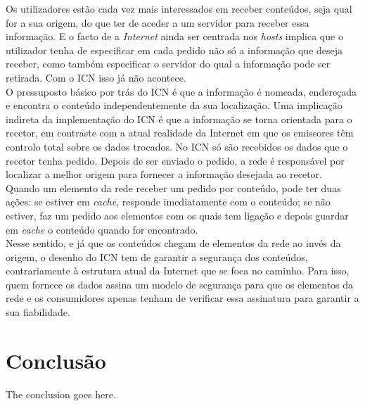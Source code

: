 \documentclass[conference]{IEEEtran}
\begin{document}
Os utilizadores est\~{a}o cada vez mais interessados em receber conte\'{u}dos, seja qual for a sua origem, do que ter de aceder a um servidor para receber essa informa\c{c}\~{a}o. E o facto de a \textit{Internet} ainda ser centrada nos \textit{hosts} implica que o utilizador tenha de especificar em cada pedido n\~{a}o s\'{o} a informa\c{c}\~{a}o que deseja receber, como tamb\'{e}m especificar o servidor do qual a informa\c{c}\~{a}o pode ser retirada. Com o ICN isso j\'{a} n\~{a}o acontece\cite{surveyICN}.\\

O pressuposto b\'{a}sico por tr\'{a}s do ICN \'{e} que a informa\c{c}\~{a}o \'{e} nomeada, endere\c{c}ada e encontra o conte\'{u}do independentemente da sua localiza\c{c}\~{a}o. Uma implica\c{c}\~{a}o indireta da implementa\c{c}\~{a}o do ICN \'{e} que a informa\c{c}\~{a}o se torna orientada para o recetor, em contraste com a atual realidade da Internet em que os emissores t\^{e}m controlo total sobre os dados trocados\cite{publishSubscribe}. No ICN s\'{o} s\~{a}o recebidos os dados que o recetor tenha pedido. Depois de ser enviado o pedido, a rede \'{e} respons\'{a}vel por localizar a melhor origem para fornecer a informa\c{c}\~{a}o desejada ao recetor.\\

Quando um elemento da rede receber um pedido por conte\'{u}do, pode ter duas a\c{c}\~{o}es: se estiver em \textit{cache}, responde imediatamente com o conte\'{u}do; se n\~{a}o estiver, faz um pedido aos elementos com os quais tem liga\c{c}\~{a}o e depois guardar em \textit{cache} o conte\'{u}do quando for encontrado\cite{surveyICN}.\\

Nesse sentido, e j\'{a} que os conte\'{u}dos chegam de elementos da rede ao inv\'{e}s da origem, o desenho do ICN tem de garantir a seguran\c{c}a dos conte\'{u}dos, contrariamente \`{a} estrutura atual da Internet que se foca no caminho. Para isso, quem fornece os dados assina um modelo de seguran\c{c}a para que os elementos da rede e os consumidores apenas tenham de verificar essa assinatura para garantir a sua fiabilidade\cite{icnForest}.\\


\section{Conclus\~{a}o}
The conclusion goes here.\\

\IEEEtriggercmd{\enlargethispage{-5in}}



\end{document}
